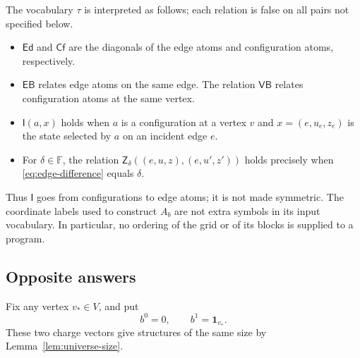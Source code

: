 The vocabulary $\tau$ is interpreted as follows; each relation is false
on all pairs not specified below.
\begin{itemize}
\item $\mathsf{Ed}$ and $\mathsf{Cf}$ are the diagonals of the edge atoms
      and configuration atoms, respectively.
\item $\mathsf{EB}$ relates edge atoms on the same edge.  The relation
      $\mathsf{VB}$ relates configuration atoms at the same vertex.
\item $\mathsf I(a,x)$ holds when $a$ is a configuration at a vertex $v$
      and $x=(e,u_e,z_e)$ is the state selected by $a$ on an incident
      edge $e$.
\item For $\delta\in\mathbb F$, the relation
      $\mathsf Z_\delta((e,u,z),(e,u',z'))$ holds precisely when
      \eqref{eq:edge-difference} equals $\delta$.
\end{itemize}
Thus $\mathsf I$ goes from configurations to edge atoms; it is not made
symmetric.  The coordinate labels used to construct $A_b$ are not extra
symbols in its input vocabulary.  In particular, no ordering of the grid
or of its blocks is supplied to a program.

\subsection{Opposite answers}

Fix any vertex $v_*\in V$, and put
\[
 b^0=0,\qquad b^1=\mathbf1_{v_*}.
\]
These two charge vectors give structures of the same size by
Lemma~\ref{lem:universe-size}.


